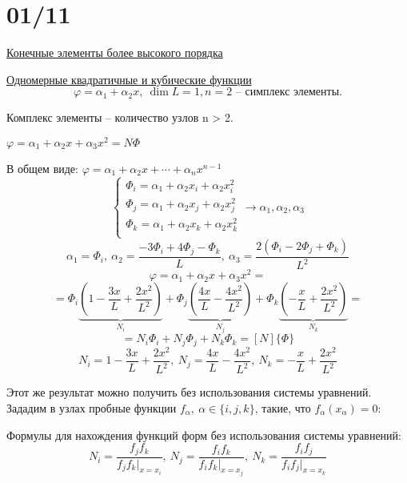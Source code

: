 \documentclass{bmstu}
\begin{document}
\section*{01/11}
\underline{Конечные элементы более высокого порядка}

\underline{Одномерные квадратичные и кубические функции}
\[
\varphi = \alpha_1 + \alpha_2x, \ \dim L = 1, n = 2 \text{ -- симплекс элементы.}
\]

Комплекс элементы -- количество узлов n > 2.  

\begin{center}
\end{center}

$\varphi = \alpha_1 + \alpha_2x + \alpha_3x^2 = N \Phi$

В общем виде: $\varphi = \alpha_1 + \alpha_2x + \cdots + \alpha_nx^{n-1}$
\[
\begin{cases}
\Phi_i = \alpha_1 + \alpha_2x_i + \alpha_2x^{2}_i \\
\Phi_j = \alpha_1 + \alpha_2x_j + \alpha_2x^{2}_j \\
\Phi_k = \alpha_1 + \alpha_2x_k + \alpha_2x^{2}_k \\
\end{cases}
\rightarrow \alpha_1, \alpha_2, \alpha_3
\]
\[
\alpha_1 = \Phi_i, \ \alpha_2 = \frac{-3\Phi_i + 4\Phi_j -\Phi_k}{L}, \ \alpha_3 = \frac{2(\Phi_i-2\Phi_j+\Phi_k)}{L^2}
\]
\[
\varphi = \alpha_1 + \alpha_2x + \alpha_3x^2 = 
\]
\[
 = \Phi_i   \underbrace{\left(1 - \frac{3x}{L} + \frac{2x^2}{L^2} \right) }_{N_i}   + \Phi_j \underbrace{\left(\frac{4x}{L} - \frac{4x^2}{L^2} \right)}_{N_j} + \Phi_k \underbrace{\left(-\frac{x}{L} + \frac{2x^2}{L^2} \right)}_{N_k} = 
\]
\[
 = N_i \Phi_i + N_j \Phi_j + N_k \Phi_k = [N]\{\Phi\}
\]
\[
N_i = 1 - \frac{3x}{L} + \frac{2x^2}{L^2}, \ N_j = \frac{4x}{L} - \frac{4x^2}{L^2}, \ N_k = -\frac{x}{L} + \frac{2x^2}{L^2}
\]

Этот же результат можно получить без использования системы уравнений. Зададим в узлах пробные функции $f_{\alpha},\ \alpha \in \{i, j, k\}$, такие, что $f_{\alpha}(x_{\alpha}) = 0$:


Формулы для нахождения функций форм без использования системы уравнений: 
\[
N_i = \frac{f_jf_k}{f_jf_k|_{x = x_i}}, \ N_j = \frac{f_if_k}{f_if_k|_{x = x_j}}, \ N_k = \frac{f_if_j}{f_if_j|_{x = x_k}}
\]
\end{document}
